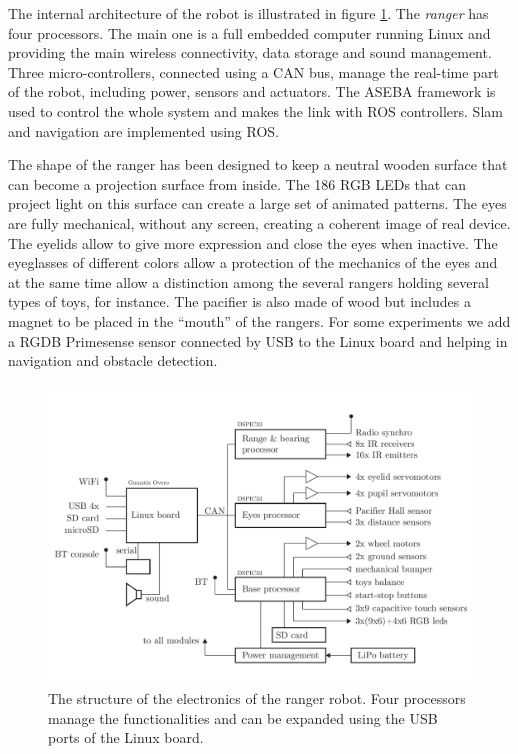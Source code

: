 \documentclass{sig-alternate}
\begin{document}
The internal architecture of the robot is illustrated in figure
\ref{fig:ranger_s}.  The \textit{ranger} has four processors.  The main one is a
full embedded computer running Linux and providing the main wireless
connectivity, data storage and sound management.  Three micro-controllers,
connected using a CAN bus, manage the real-time part of the robot, including
power, sensors and actuators.  The ASEBA framework \cite{ASEBA} is used to
control the whole system and makes the link with ROS controllers.  Slam and
navigation are implemented using ROS.

The shape of the ranger has been designed to keep a neutral wooden surface that
can become a projection surface from inside.  The 186 RGB LEDs that can project
light on this surface can create a large set of animated patterns.  The eyes are
fully mechanical, without any screen, creating a coherent image of real device.
The eyelids allow to give more expression and close the eyes when inactive.  The
eyeglasses of different colors allow a protection of the mechanics of the eyes
and at the same time allow a distinction among the several rangers holding
several types of toys, for instance.  The pacifier is also made of wood but
includes a magnet to be placed in the ``mouth'' of the rangers.  For some
experiments we add a RGDB Primesense sensor connected by USB to the Linux board
and helping in navigation and obstacle detection.

\begin{figure}[ht]
 \centering
    \includegraphics[width=0.9\columnwidth]{system-scheme.pdf}
  \caption{The structure of the electronics of the ranger robot. Four processors
  manage the functionalities and can be expanded using the USB ports of the
  Linux board.}
  \label{fig:ranger_s} 
\end{figure}
\end{document}
